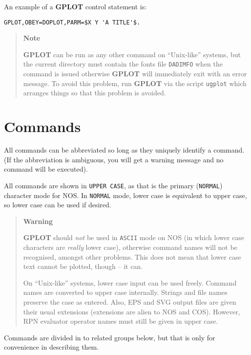 \documentclass[a4paper,twoside,11pt]{article}
\newcommand{\newpara}{\par\vspace{4mm}\noindent}
\begin{document}
An example of a \textbf{GPLOT} control statement is:
\begin{verbatim}
GPLOT,OBEY=DOPLOT,PARM=$X Y 'A TITLE'$.
\end{verbatim}

\begin{quote}
\begin{center}
\textbf{Note}\\
\end{center}
\textbf{GPLOT} can be run as any other command on ``Unix-like'' systems, but the current directory
must contain the fonts file \texttt{DADIMFO} when the command is issued otherwise \textbf{GPLOT} will
immediately exit with an error message. To avoid this problem, run \textbf{GPLOT} via the script \texttt{ugplot}
which arranges things so that this problem is avoided.
\end{quote}

\section{Commands}
All commands can be abbreviated so long as they uniquely identify a command.
(If the abbreviation is ambiguous, you will get a warning message and no command will
be executed). 
\newpara
All commands are shown in \texttt{UPPER CASE}, as that is the primary (\texttt{NORMAL}) character mode
for NOS. In \texttt{NORMAL} mode, lower case is equivalent to upper case, so lower case can be used
if desired. 

\begin{quote}
\begin{center}
\textbf{Warning}\\
\end{center}
\textbf{GPLOT} should
\textit{not} be used in \texttt{ASCII} mode on NOS (in which lower case characters are \textit{really} lower case),
otherwise command names will not be recognised, amongst other problems.
This does not mean that lower case text cannot be plotted, though -- it can.

\newpara
On ``Unix-like'' systems, lower case input can be used freely. Command names are converted to upper case internally.
Strings and file names preserve the case as entered. Also, EPS and SVG output files are given their usual extensions
(extensions are alien to NOS and COS). However, RPN evaluator operator names must still be given in
upper case.
\end{quote}

\newpara
Commands are divided in to related groups below, but that is only for 
convenience in describing them.
\end{document}
